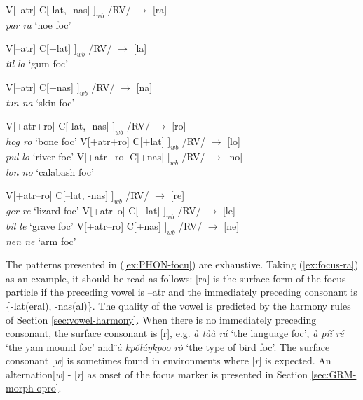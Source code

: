 \begin{exe}
\ex\label{ex:PHON-focu} 
\begin{xlist}
\ex\label{ex:focus-ra} 
 V[{\sc --atr}]  C[{\sc -lat}, {\sc -nas}]  $]_{wb}$ /RV/   $\rightarrow$ [ra] 
\\ 
{\it par ra} {\rm  `hoe {\sc foc}'}

\ex\label{ex:} 
 V[{\sc --atr}]  C[{\sc +lat}]   $]_{wb}$ /RV/   $\rightarrow$ [la] \\
{\it tɪl la} {\rm  `gum {\sc foc}'}

\ex\label{ex:}
 V[{\sc --atr}] C[{\sc +nas}]   $]_{wb}$  /RV/   $\rightarrow$ [na]\\
 {\it tɔn na}   {\rm `skin {\sc foc}'}

\ex\label{ex:} 
 V[{\sc +atr}{\sc +ro}]  C[{\sc -lat}, {\sc -nas}] $]_{wb}$  /RV/   
$\rightarrow$ [ro] \\
 {\it hog ro}   {\rm `bone {\sc foc}'}
\ex\label{ex:} 
  V[{\sc +atr}{\sc +ro}]  C[{\sc +lat}] $]_{wb}$  /RV/   $\rightarrow$ [lo] \\
 {\it pul lo}   {\rm `river {\sc foc}'}
\ex\label{ex:}
  V[{\sc +atr}{\sc +ro}]  C[{\sc +nas}] $]_{wb}$ /RV/   $\rightarrow$ [no]\\
 {\it lon no}   {\rm `calabash {\sc foc}'}

\ex\label{ex:} 
  V[{\sc +atr}{\sc --ro}]  C[{\sc --lat}, {\sc -nas}] $]_{wb}$  /RV/   
$\rightarrow$ [re] \\
 {\it ger re}   {\rm `lizard {\sc foc}'}
\ex\label{ex:} 
  V[{\sc +atr}{\sc --o}] C[{\sc +lat}]  $]_{wb}$  /RV/   $\rightarrow$ [le] \\
 {\it bil le}   {\rm `grave {\sc foc}'}
\ex\label{ex:}
 V[{\sc +atr}{\sc --ro}] C[{\sc +nas}]   $]_{wb}$  /RV/   $\rightarrow$ [ne]\\
 {\it nen ne}   {\rm `arm {\sc foc}'}



\end{xlist}

\end{exe}


The patterns presented in (\ref{ex:PHON-focu}) are exhaustive. Taking
(\ref{ex:focus-ra}) as an example, it should be read as follows: [ra] is the
surface form of the focus particle if the preceding vowel is   {\sc --atr} and
the immediately preceding consonant is \{{\sc -lat(eral), -nas(al)}\}. The
quality
of the vowel is predicted by the harmony rules of Section
\ref{sec:vowel-harmony}.  When there is
no immediately preceding consonant,  the surface consonant is [r], e.g. {\it à
tàà
rá} `the language {\sc foc}', {\it  à píí ré} `the yam mound {\sc foc}' 
and {\it 
̂à kpólúŋkpōō rò} `the type of bird {\sc foc}'.   The surface consonant  
[{\it w}] is
sometimes found in  environments where  [{\it r}] is expected. An 
alternation[{\it w}] - [{\it r}] as onset of the focus marker is presented in
Section \ref{sec:GRM-morph-opro}.


